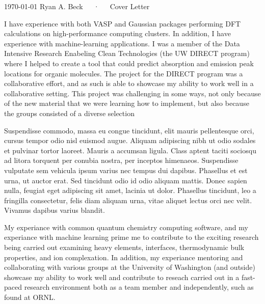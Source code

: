 \documentclass[12pt, a4paper]{awesome-cv}
\begin{document}
\makecvheader[R]

\makecvfooter
  {\today}
  {Ryan A. Beck~~~·~~~Cover Letter}
  {}

\makelettertitle

\begin{cvletter}

I have experience with both VASP and 
Gaussian packages performing DFT calculations on high-performance computing
clusters.  In addition, I have experience with 
machine-learning applications.  I was a member of the Data Intensive Research
Enabeling Clean Technologies (the UW DIRECT program) where I helped to create 
a tool that could 
predict absorption and emission peak locations for organic molecules.  The 
project for the DIRECT program was a collaborative effort, and as such is able
to showcase my ability to work well in a collaborative setting.  This project 
was challenging in some ways, not only because of the new material that we were 
learning how to implement, but also because the groups consisted of a diverse 
selection

Suspendisse commodo, massa eu congue tincidunt, elit mauris pellentesque orci, cursus tempor odio nisl euismod augue. Aliquam adipiscing nibh ut odio sodales et pulvinar tortor laoreet. Mauris a accumsan ligula. Class aptent taciti sociosqu ad litora torquent per conubia nostra, per inceptos himenaeos. Suspendisse vulputate sem vehicula ipsum varius nec tempus dui dapibus. Phasellus et est urna, ut auctor erat. Sed tincidunt odio id odio aliquam mattis. Donec sapien nulla, feugiat eget adipiscing sit amet, lacinia ut dolor. Phasellus tincidunt, leo a fringilla consectetur, felis diam aliquam urna, vitae aliquet lectus orci nec velit. Vivamus dapibus varius blandit.

My experiance with common quantum chemistry computing software, and my 
experiance with machine learning prime me to contribute to the exciting research 
being carried out examining heavy elements, interfaces, thermodynamic bulk 
properties, and ion complexation.  In addition, my experiance mentoring and 
collaborating with various groups at the University of Washington (and outside) 
showcase my ability to work well and contribute to reseach carried out in
a fast-paced research environment both as a team member and independently, such 
as found at ORNL.

\end{cvletter}


\makeletterclosing
\end{document}
